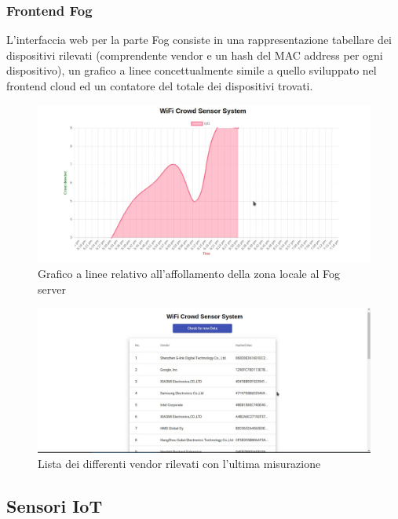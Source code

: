 \subsubsection{Frontend Fog}

L'interfaccia web per la parte Fog consiste in una rappresentazione tabellare dei dispositivi rilevati (comprendente vendor e un hash del MAC address per ogni dispositivo), un grafico a linee concettualmente simile a quello sviluppato nel frontend cloud ed un contatore del totale dei dispositivi trovati.

\begin{figure}[H]
  \centering
  \includegraphics[width=\textwidth]{res/fig/Fog-chart.jpg}
  \caption{Grafico a linee relativo all'affollamento della zona locale al Fog server}%
  \label{fig:Fog-chart}
\end{figure}

\begin{figure}[H]
  \centering
  \includegraphics[width=\textwidth]{res/fig/Fog-table.jpg}
  \caption{Lista dei differenti vendor rilevati con l'ultima misurazione}%
  \label{fig:Fog-table}
\end{figure}

\subsection{Sensori IoT}

